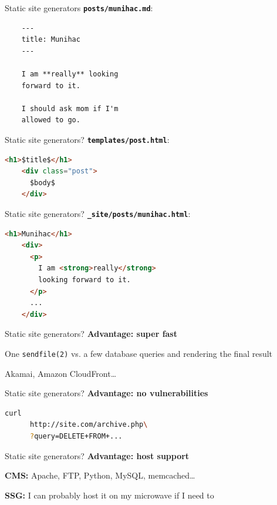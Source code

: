 \documentclass[20pt]{beamer}
\newcommand{\vspaced}{
    \vspace{5mm}
}
\begin{document}
\begin{frame}[fragile]{Static site generators}
    \textbf{\texttt{posts/munihac.md}}:
    \vspaced
    \begin{lstlisting}
    ---
    title: Munihac
    ---

    I am **really** looking
    forward to it.

    I should ask mom if I'm
    allowed to go.
    \end{lstlisting}
\end{frame}

\begin{frame}[fragile]{Static site generators?}
    \textbf{\texttt{templates/post.html}}:
    \vspaced
    \begin{lstlisting}[language=HTML]
    <h1>$title$</h1>
    <div class="post">
      $body$
    </div>
    \end{lstlisting}
\end{frame}

\begin{frame}[fragile]{Static site generators?}
    \textbf{\texttt{\_site/posts/munihac.html}}:
    \vspaced
    \begin{lstlisting}[language=HTML]
    <h1>Munihac</h1>
    <div>
      <p>
        I am <strong>really</strong>
        looking forward to it.
      </p>
      ...
    </div>
    \end{lstlisting}
\end{frame}

\begin{frame}{Static site generators?}
    \textbf{Advantage: super fast} \\
    \vspaced
    One \texttt{sendfile(2)} vs. a few database queries and rendering the final
    result \\
    \vspaced
    Akamai, Amazon CloudFront\ldots
\end{frame}

\begin{frame}[fragile]{Static site generators?}
    \textbf{Advantage: no vulnerabilities} \\
    \vspaced
    \begin{lstlisting}[language=bash]
    curl
      http://site.com/archive.php\
      ?query=DELETE+FROM+...
    \end{lstlisting}
\end{frame}

\begin{frame}{Static site generators?}
    \textbf{Advantage: host support} \\
    \vspaced
    \textbf{CMS:} Apache, FTP, Python, MySQL, memcached\ldots \\
    \vspaced
    \textbf{SSG:} I can probably host it on my microwave if I need to
\end{frame}
\end{document}
